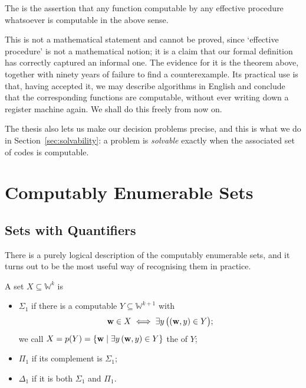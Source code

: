 \documentclass[a4paper]{scrartcl}
\newcommand{\WW}{\mathbb{W}}
\begin{document}
\begin{definition}
	The  is the assertion that any function computable by any effective procedure whatsoever is computable in the above sense.
\end{definition}

This is not a mathematical statement and cannot be proved, since `effective procedure' is not a mathematical notion; it is a claim that our formal definition has correctly captured an informal one. The evidence for it is the theorem above, together with ninety years of failure to find a counterexample. Its practical use is that, having accepted it, we may describe algorithms in English and conclude that the corresponding functions are computable, without ever writing down a register machine again. We shall do this freely from now on.

\begin{remark}
	The thesis also lets us make our decision problems precise, and this is what we do in Section~\ref{sec:solvability}: a problem is \emph{solvable} exactly when the associated set of codes is computable.
\end{remark}

\section{Computably Enumerable Sets}\label{sec:re}

\subsection{Sets with Quantifiers}

There is a purely logical description of the computably enumerable sets, and it turns out to be the most useful way of recognising them in practice.

\begin{definition}
	A set $X \subseteq \WW^k$ is
	\begin{itemize}
		\item $\Sigma_1$ if there is a computable $Y \subseteq \WW^{k+1}$ with
		$$\mathbf{w} \in X \iff \exists y\, \big((\mathbf{w}, y) \in Y\big);$$
		we call $X = p(Y) = \{\mathbf{w} \mid \exists y\, (\mathbf{w}, y) \in Y\}$ the  of $Y$;
		\item $\Pi_1$ if its complement is $\Sigma_1$;
		\item $\Delta_1$ if it is both $\Sigma_1$ and $\Pi_1$.
	\end{itemize}
\end{definition}
\end{document}

